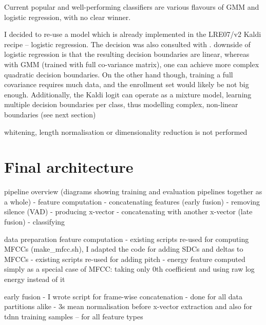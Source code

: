 \documentclass[bsc,frontabs,twoside,singlespacing,parskip,deptreport]{infthesis}
\begin{document}
{{    Current popular and well-performing classifiers are various flavours of GMM and logistic regression, with no clear winner. 

    I decided to re-use a model which is already implemented in the LRE07/v2 Kaldi recipe -- logistic regression. The decision was also consulted with \cite{Snyder_2018_kaldi-help}. 
    downside of logistic regression is that the resulting decision boundaries are linear, whereas with GMM (trained with full co-variance matrix), one can achieve more complex quadratic decision boundaries. 
    On the other hand though, training a full covariance requires much data, and the enrollment set would likely be not big enough. 
    Additionally, the Kaldi logit can operate as a mixture model, learning multiple decision boundaries per class, thus modelling complex, non-linear boundaries (see next section)

    whitening, length normalisation or dimensionality reduction is not performed

  }

  \section{Final architecture}{
    \label{sec:architecture}

    pipeline overview (diagrams showing training and evaluation pipelines together as a whole)
    - feature computation
    - concatenating features (early fusion)
    - removing silence (VAD)
    - producing x-vector
    - concatenating with another x-vector (late fusion)
    - classifying

    data preparation
      feature computation
      - existing scripts re-used for computing MFCCs (make\_mfcc.sh), I adapted the code for adding SDCs and deltas to MFCCs
      - existing scripts re-used for adding pitch
      - energy feature computed simply as a special case of MFCC: taking only 0th coefficient and using raw log energy instead of it

      early fusion
      - I wrote script for frame-wise concatenation
      - done for all data partitions alike
      - 3s mean normalisation before x-vector extraction and also for tdnn training samples -- for all feature types

}}
\end{document}
